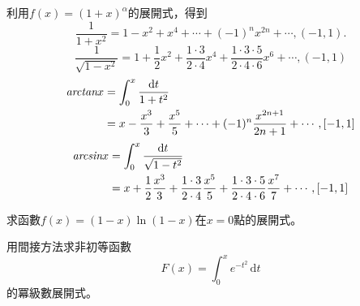 \documentclass[a4paper,12pt]{article}
\theoremstyle{theorem}
\begin{document}
\begin{CJK*}{UTF8}{bsmi}
    \begin{example}
        利用$f(x) = (1+x)^{\alpha}$的展開式，得到
        \begin{equation}
            \frac{1}{1+x^2} = 1 - x^2 + x^4 + \cdots + (-1)^nx^{2n} + 
            \cdots, (-1, 1).
        \end{equation}
        \begin{equation}
            \frac{1}{\sqrt{1-x^2}} = 1 + \frac{1}{2}x^2 + \frac{1 \cdot 3}
            {2 \cdot 4}x^4 + \frac{1 \cdot 3 \cdot 5}{2 \cdot 4 \cdot 6}
            x^6 + \cdots, (-1, 1)
        \end{equation}
        \begin{equation}
            \begin{split}
                \emph{arctan}x & = \int_0^x\frac{\mathrm{d}t}{1+t^2}\\
                & = x - \frac{x^3}{3} + \frac{x^5}{5} + \cdots + 
                (-1)^n\frac{x^{2n+1}}{2n+1} + \cdots, [-1, 1]
            \end{split}
        \end{equation}
        \begin{equation}
            \begin{split}
                \emph{arcsin}x & = \int_0^x\frac{\mathrm{d}t}{\sqrt{1-t^2}}\\
                & = x + \frac{1}{2}\frac{x^3}{3} + \frac{1 \cdot 3}{2 \cdot 4}
                \frac{x^5}{5} + \frac{1 \cdot 3 \cdot 5}{2 \cdot 4 \cdot 6}\frac{x^7}{7} 
                + \cdots, [-1, 1]
            \end{split}
        \end{equation}
    \end{example}
    
    \begin{example}
        求函數$\displaystyle f(x) = (1-x)\ln(1-x)$在$x=0$點的展開式。
    \end{example}
    \begin{example}
        用間接方法求非初等函數
        \[
            F(x) = \int_0^x e^{-t^2}\, \mathrm{d}t
        \]
        的冪級數展開式。
    \end{example}

\end{CJK*}
\end{document}
